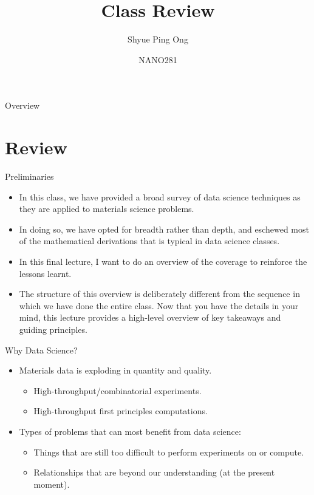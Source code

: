 \documentclass{beamer}
\title[Class Review]{Class Review}
\author{Shyue Ping Ong}
\institute[UCSD]{University of California, San Diego\\
\medskip
}
\date{NANO281} %
\begin{document}
\begin{frame}
    \titlepage %
\end{frame}


\begin{frame}{Overview}
    \tableofcontents
\end{frame}


\section{Review}


\begin{frame}{Preliminaries}
    \begin{itemize}
        \item In this class, we have provided a broad survey of data science techniques as they are applied to materials science problems.
        \item In doing so, we have opted for breadth rather than depth, and eschewed most of the mathematical derivations that is typical in data science classes.
        \item In this final lecture, I want to do an overview of the coverage to reinforce the lessons learnt.
        \item The structure of this overview is deliberately different from the sequence in which we have done the entire class. Now that you have the details in your mind, this lecture provides a high-level overview of key takeaways and guiding principles.
    \end{itemize}
\end{frame}


\begin{frame}{Why Data Science?}
    \begin{itemize}
        \item Materials data is exploding in quantity and quality.
        \begin{itemize}
            \item High-throughput/combinatorial experiments.
            \item High-throughput first principles computations.
        \end{itemize}
        \item Types of problems that can most benefit from data science:
        \begin{itemize}
            \item Things that are still too difficult to perform experiments on or compute.
            \item Relationships that are beyond our understanding (at the present moment). 
        \end{itemize}
    \end{itemize}
\end{frame}
\end{document}
